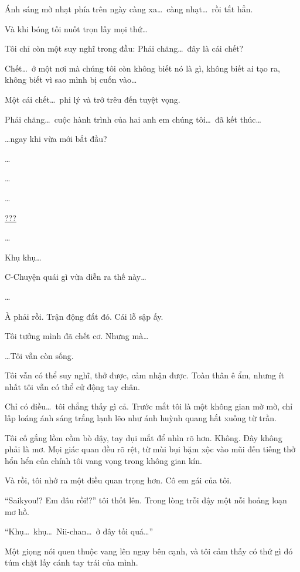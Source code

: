 \documentclass[../main.tex]{subfiles}
\begin{document}
Ánh sáng mờ nhạt phía trên ngày càng xa\dots\ càng nhạt\dots\ rồi tắt hẳn.

Và khi bóng tối nuốt trọn lấy mọi thứ\dots

Tôi chỉ còn một suy nghĩ trong đầu: Phải chăng\dots\ đây là cái chết?

Chết\dots\ ở một nơi mà chúng tôi còn không biết nó là gì, không biết ai tạo ra, không biết vì sao mình bị cuốn vào\dots

Một cái chết\dots\ phi lý và trớ trêu đến tuyệt vọng.

Phải chăng\dots\ cuộc hành trình của hai anh em chúng tôi\dots\ đã kết thúc\dots

\dots ngay khi vừa mới bắt đầu?

\dots

\dots

\dots

\begin{center}
  \uline{???}
\end{center}

\dots

Khụ khụ\dots

C-Chuyện quái gì vừa diễn ra thế này\dots

\dots

À phải rồi. Trận động đất đó. Cái lỗ sập ấy.

Tôi tưởng mình đã chết cơ. Nhưng mà\dots

\dots Tôi vẫn còn sống.

Tôi vẫn có thể suy nghĩ, thở được, cảm nhận được. Toàn thân ê ẩm, nhưng ít nhất tôi vẫn có thể cử động tay chân.

Chỉ có điều\dots\ tôi chẳng thấy gì cả. Trước mắt tôi là một không gian mờ mờ, chỉ lấp loáng ánh sáng trắng lạnh lẽo như ánh huỳnh quang hắt xuống từ trần.

Tôi cố gắng lồm cồm bò dậy, tay dụi mắt để nhìn rõ hơn. Không. Đây không phải là mơ. Mọi giác quan đều rõ rệt, từ mùi bụi bặm xộc vào mũi đến tiếng thở hổn hển của chính tôi vang vọng trong không gian kín.

Và rồi, tôi nhớ ra một điều quan trọng hơn. Cô em gái của tôi.

``Saikyou!? Em đâu rồi!?'' tôi thốt lên. Trong lòng trỗi dậy một nỗi hoảng loạn mơ hồ.

``Khụ\dots\ khụ\dots\ Nii-chan\dots\ ở đây tối quá\dots''

Một giọng nói quen thuộc vang lên ngay bên cạnh, và tôi cảm thấy có thứ gì đó túm chặt lấy cánh tay trái của mình.
\end{document}
